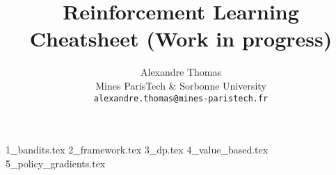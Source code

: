 \documentclass{article}
\title{\Large{Reinforcement Learning Cheatsheet (Work in progress)}}
\author{
  Alexandre Thomas\\
  Mines ParisTech \& Sorbonne University\\
  \texttt{alexandre.thomas@mines-paristech.fr}
}
\begin{document}
\maketitle



\setcounter{tocdepth}{3}
\tableofcontents{}
\newpage

{1_bandits.tex}
{2_framework.tex}
{3_dp.tex}
{4_value_based.tex}
{5_policy_gradients.tex}

\medskip

\footnotesize

\end{document}
